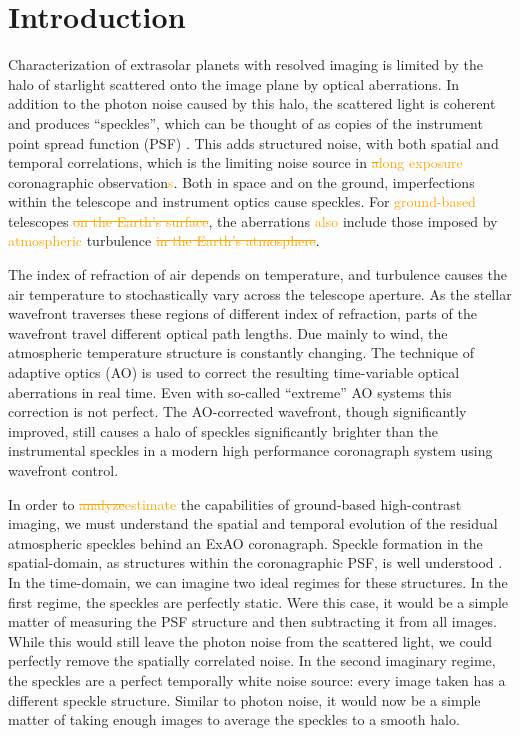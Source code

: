 \documentclass[10pt,preprint]{aastex631}
\newcommand{\ogadd}[1]{\textcolor{orange}{#1}}
\newcommand{\ogrmv}[1]{\textcolor{orange}{\sout{#1}}}
\begin{document}
\section{Introduction}
Characterization of extrasolar planets with resolved imaging is limited by the halo of starlight scattered onto the image plane by optical aberrations.  In addition to the photon noise caused by this halo, the scattered light is coherent and produces ``speckles'', which can be thought of as copies of the instrument point spread function (PSF) \citep{1995PASP..107..386M}.  This adds structured noise, with both spatial and temporal correlations, which is the limiting noise source in \ogrmv{a}\ogadd{long exposure} coronagraphic observation\ogadd{s}.    Both in space and on the ground, imperfections within the telescope and instrument optics cause speckles.   For \ogadd{ground-based} telescopes \ogrmv{on the Earth's surface}, the aberrations \ogadd{also} include those imposed by \ogadd{atmospheric} turbulence \ogrmv{in the Earth's atmosphere}. 

The index of refraction of air depends on temperature, and turbulence causes the air temperature to stochastically vary across the telescope aperture.  As the stellar wavefront traverses these regions of different index of refraction, parts of the wavefront travel different optical path lengths.  Due mainly to wind, the atmospheric temperature structure is constantly changing.  The technique of adaptive optics (AO) is used to correct the resulting time-variable optical aberrations in real time.  Even with so-called ``extreme'' AO systems \citep[ExAO, ][]{2018ARAA..56..315G} this correction is not perfect.  The AO-corrected wavefront, though significantly improved, still causes a halo of speckles significantly brighter than the instrumental speckles in a modern high performance coronagraph system using wavefront control.

In order to \ogrmv{analyze}\ogadd{estimate} the capabilities of ground-based high-contrast imaging, we must understand the spatial and temporal evolution of the residual atmospheric speckles behind an ExAO coronagraph.  Speckle formation in the spatial-domain, as structures within the coronagraphic PSF, is well understood \citep{2001ApJ...558L..71B,2003ApJ...596..702P,2007ApJ...669..642S}.  In the time-domain, we can imagine two ideal regimes for these structures.  In the first regime, the speckles are perfectly static.  Were this case, it would be a simple matter of measuring the PSF structure and then subtracting it from all images.  While this would still leave the photon noise from the scattered light, we could perfectly remove the spatially correlated noise.  In the second imaginary regime, the speckles are a perfect temporally white noise source: every image taken has a different speckle structure.  Similar to photon noise, it would now be a simple matter of taking enough images to average the speckles to a smooth halo.
\end{document}
